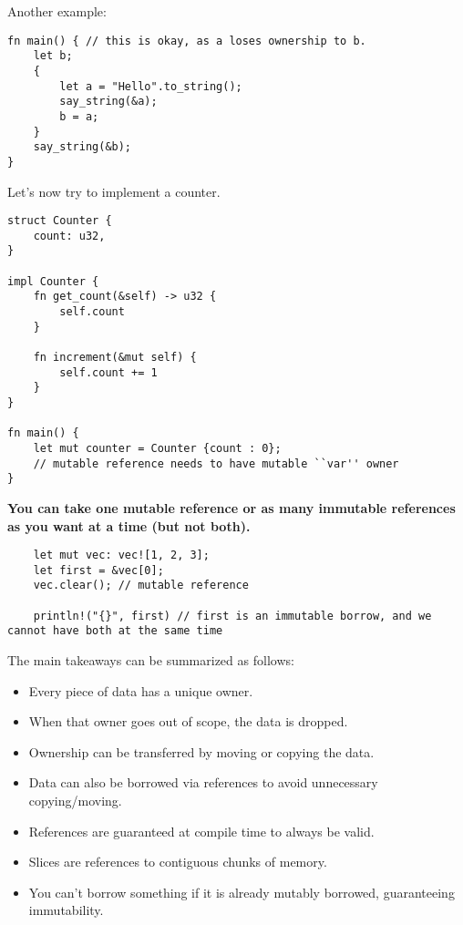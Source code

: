 \documentclass[12pt]{amsart}
\begin{document}
Another example:
\begin{lstlisting}
fn main() { // this is okay, as a loses ownership to b.
    let b;
    {
        let a = "Hello".to_string();
        say_string(&a);
        b = a;
    }
    say_string(&b);
}
\end{lstlisting}

Let's now try to implement a counter.

\begin{lstlisting}
struct Counter {
    count: u32,
}

impl Counter {
    fn get_count(&self) -> u32 {
        self.count
    }

    fn increment(&mut self) {
        self.count += 1
    }
}

fn main() {
    let mut counter = Counter {count : 0}; 
    // mutable reference needs to have mutable ``var'' owner
}
\end{lstlisting}

\textbf{You can take one mutable reference or as many immutable references as you want at a time (but not both).}

\begin{lstlisting}
    let mut vec: vec![1, 2, 3];
    let first = &vec[0];
    vec.clear(); // mutable reference

    println!("{}", first) // first is an immutable borrow, and we cannot have both at the same time
\end{lstlisting}

The main takeaways can be summarized as follows: \vspace{-0.1cm}\begin{itemize}
\item Every piece of data has a unique owner.
\item When that owner goes out of scope, the data is dropped.
\item Ownership can be transferred by moving or copying the data.
\item Data can also be borrowed via references to avoid unnecessary copying/moving.
\item References are guaranteed at compile time to always be valid.
\item Slices are references to contiguous chunks of memory.
\item You can't borrow something if it is already mutably borrowed, guaranteeing immutability.
\end{itemize}
\end{document}
